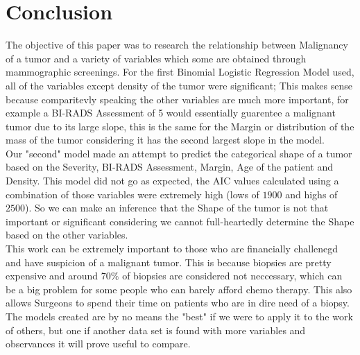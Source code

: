 \documentclass{article}
\begin{document}
\section{Conclusion}
\indent The objective of this paper was to research the relationship between Malignancy of a tumor and a variety of variables which some are obtained through mammographic screenings. For the first Binomial Logistic Regression Model used, all of the variables except density of the tumor were significant; This makes sense because comparitevly speaking the other variables are much more important, for example a BI-RADS Assessment of 5 would essentially guarentee a malignant tumor due to its large slope, this is the same for the Margin or distribution of the mass of the tumor considering it has the second largest slope in the model. \\
\indent Our "second" model made an attempt to predict the categorical shape of a tumor based on the Severity, BI-RADS Assessment, Margin, Age of the patient and Density. This model did not go as expected, the AIC values calculated using a combination of those variables were extremely high (lows of $1900$ and highs of $2500$). So we can make an inference that the Shape of the tumor is not that important or significant considering we cannot full-heartedly determine the Shape based on the other variables. \\
\indent This work can be extremely important to those who are financially challenegd and have suspicion of a malignant tumor. This is because biopsies are pretty expensive and around $70\%$ of biopsies are considered not neccessary, which can be a big problem for some people who can barely afford chemo therapy. This also allows Surgeons to spend their time on patients who are in dire need of a biopsy. The models created are by no means the "best" if we were to apply it to the work of others, but one if another data set is found with more variables and observances it will prove useful to compare.\\
\end{document}
